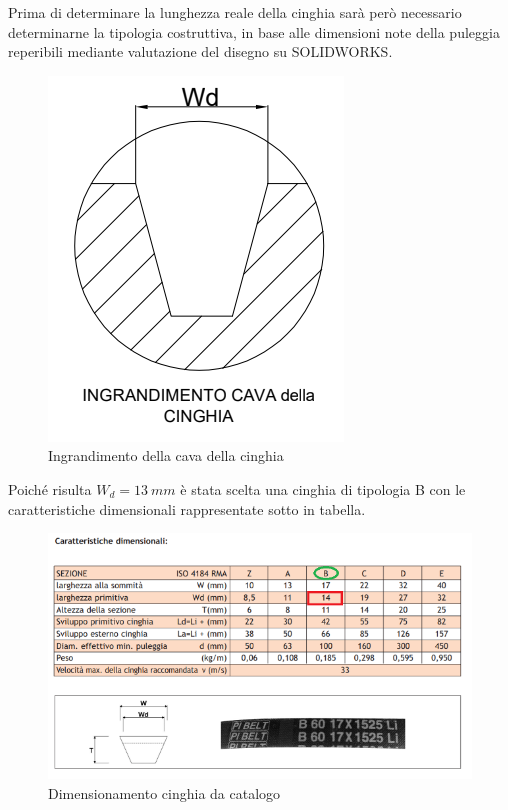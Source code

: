 Prima di determinare la lunghezza reale della cinghia sarà però necessario determinarne la tipologia costruttiva, in base alle dimensioni note della puleggia reperibili mediante valutazione del disegno su SOLIDWORKS.\\
\begin{figure}[h!]
    \centering
    \includegraphics[scale=0.6]{Immagini/IngrandimentoCinghia.png}
    \caption{Ingrandimento della cava della cinghia}
    \label{fig:IngrandimentoCinghia}
\end{figure}

Poiché risulta $W_d=13\ mm$ è stata scelta una cinghia di tipologia B con le caratteristiche dimensionali rappresentate sotto in tabella.\\
\begin{figure}[h]
    \centering
    \includegraphics[scale=0.7]{Immagini/CaratteristicheDimensionaliCinghia.png}
    \caption{Dimensionamento cinghia da catalogo}
    \label{fig:CaratteristicheDimensionaliCinghia}
\end{figure}

